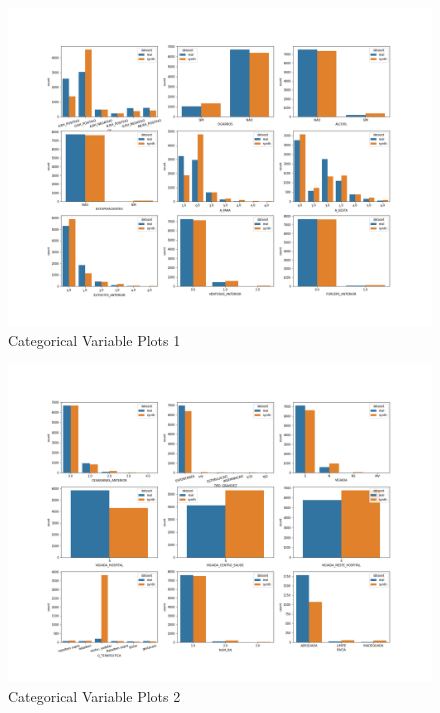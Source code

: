 \documentclass{article}
\begin{document}
\begin{figure}[H]
\centering
\includegraphics[width=\textwidth]{images/categorical_plot_0.png}
\caption{Categorical Variable Plots 1}
\label{fig:categorical1}
\end{figure}

\begin{figure}[H]
\centering
\includegraphics[width=\textwidth]{images/categorical_plot_1.png}
\caption{Categorical Variable Plots 2}
\label{fig:categorical2}
\end{figure}
\end{document}
